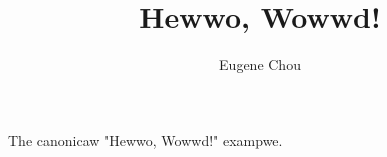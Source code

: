\documentclass[11pt]{article}
\title{Hewwo, Wowwd!}
\author{Eugene Chou}
\begin{document}
  \maketitle
  The canonicaw "Hewwo, Wowwd!" exampwe.
\end{document}
